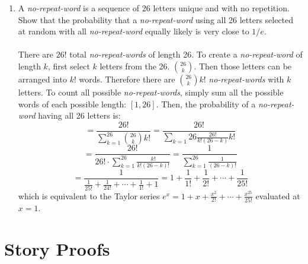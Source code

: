 \documentclass[11pt, oneside]{article}   	%
\begin{document}
\begin{enumerate}
\begin{enumerate}
			\end{enumerate}
		\item A \textit{no-repeat-word} is a sequence of 26 letters unique and with no repetition. Show that the probability that a \textit{no-repeat-word} using all 26 letters selected at random with all \textit{no-repeat-word}  equally likely is very close to $1/e$. \\\\
			There are $26!$ total \textit{no-repeat-words} of length 26. To create a \textit{no-repeat-word} of length $k$, first select $k$ letters from the 26. $\binom{26}{k}$. Then those letters can be arranged into $k!$ words. Therefore there are $\binom{26}{k}k!$
			\textit{no-repeat-words} with $k$ letters. To count all possible \textit{no-repeat-words}, simply sum all the possible words of each possible length: $[1, 26]$. Then, the probability of a \textit{no-repeat-word} having all 26 letters is:
			\[ 
				= \frac{26!}{\sum_{k=1}^{26} \binom{26}{k} k!} = \frac{26!}{\sum_{k=1}{26} \frac{26!}{k!(26-k)} k!}
			\]
			\[
				= \frac{26!}{26! \cdot \sum_{k=1}^{26} \frac{k!}{k!(26-k)!} } = \frac{1}{\sum_{k=1}^{26} \frac{1}{(26-k)!}}
			\]
			\[
				= \frac{1}{ \frac{1}{25!} + \frac{1}{24!} + \cdots + \frac{1}{1!} + 1} = 1 + \frac{1}{1!} + \frac{1}{2!} + \cdots + \frac{1}{25!}
			\]
			which is equivalent to the Taylor series $e^x = 1 + x + \frac{x^2}{2!} + \cdots + \frac{x^{25}}{25!}$ evaluated at $x=1$.
	\end{enumerate}

\section{Story Proofs}
\end{document}
